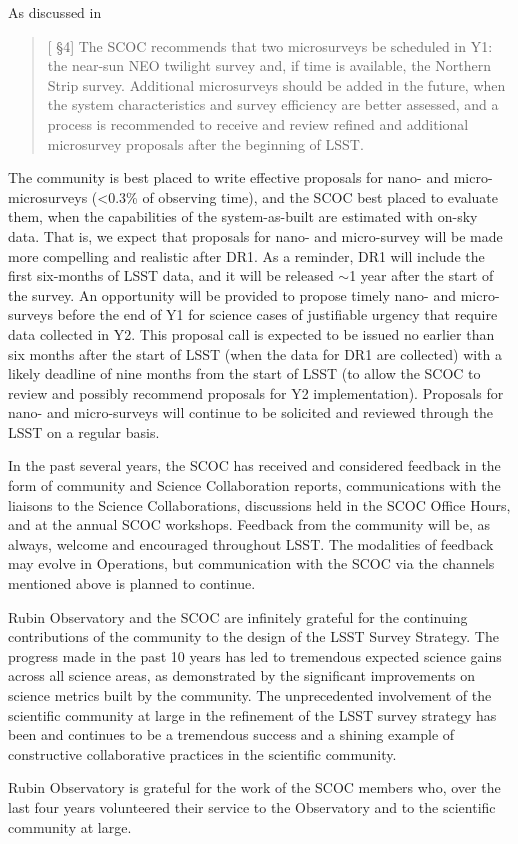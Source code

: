 As discussed in  
\begin{quote}
    {[ \S4] The SCOC recommends that two microsurveys be scheduled in Y1: the near-sun NEO twilight survey and, if time is available, the Northern Strip survey. Additional microsurveys should be added in the future, when the system characteristics and survey efficiency are better assessed, and a process is recommended to receive and review refined and additional microsurvey proposals after the beginning of LSST.}
\end{quote}

The community is best placed to write effective proposals for  nano- and micro-microsurveys (<0.3\% of observing time), and the SCOC best placed to evaluate them, when the capabilities of the system-as-built are estimated with on-sky data. That is, we expect that proposals for nano- and micro-survey will be made more compelling and realistic after DR1. As a reminder, DR1 will include the first six-months of LSST data, and it will be released $\sim$1 year after the start of the survey. An opportunity will be provided to propose timely nano- and micro-surveys before the end of Y1 for science cases of justifiable urgency that require data collected in Y2. This proposal call is expected to be issued no earlier than six months after the start of LSST (when the data for DR1 are collected) with a likely deadline of nine months from the start of LSST (to allow the SCOC to review and possibly recommend proposals for Y2 implementation). Proposals for nano- and micro-surveys will continue to be solicited and reviewed through the LSST on a regular basis. 

In the past several years, the SCOC has received and considered feedback in the form of community and Science Collaboration reports, communications with the liaisons to the Science Collaborations, discussions held in the SCOC Office Hours, and at the annual SCOC workshops. Feedback from the community will be, as always, welcome and encouraged throughout LSST. The modalities of feedback may evolve in Operations, but communication with the SCOC via the channels mentioned above is planned to continue. 

Rubin Observatory and the SCOC are infinitely grateful for the continuing contributions of the community to the design of the LSST Survey Strategy. The progress made in the past 10 years has led to tremendous expected science gains across all science areas, as demonstrated by the significant improvements on science metrics built by the community. The unprecedented involvement of the scientific community at large in the refinement of the LSST survey strategy has been and continues to be a tremendous success and a shining example of constructive collaborative practices in the scientific community. 

Rubin Observatory is grateful for the work of the SCOC members who, over the last four years volunteered their service to the Observatory and to the scientific community at large.
 